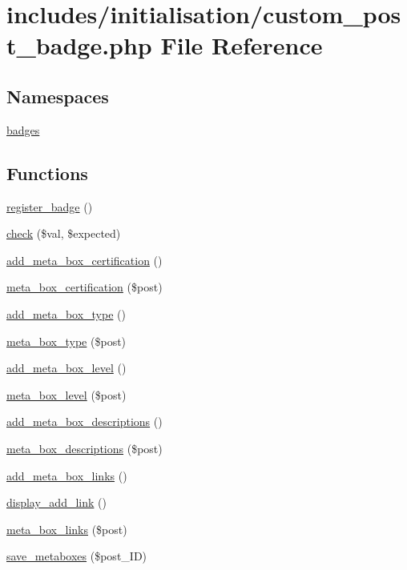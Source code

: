 \hypertarget{custom__post__badge_8php}{}\section{includes/initialisation/custom\+\_\+post\+\_\+badge.php File Reference}
\label{custom__post__badge_8php}
\subsection*{Namespaces}
\begin{DoxyCompactItemize}
\item 
 \hyperlink{namespacebadges}{badges}
\end{DoxyCompactItemize}
\subsection*{Functions}
\begin{DoxyCompactItemize}
\item 
\hyperlink{custom__post__badge_8php_a33deba5b6a1388aa48d025aa34ec563b}{register\+\_\+badge} ()
\item 
\hyperlink{custom__post__badge_8php_a4920b56515f99313245ba19ff157a6cb}{check} (\$val, \$expected)
\item 
\hyperlink{custom__post__badge_8php_a6e6e0c44942c25f85776256861a3fd1b}{add\+\_\+meta\+\_\+box\+\_\+certification} ()
\item 
\hyperlink{custom__post__badge_8php_a37a17ab374405a4d4b22ca9b7e15ca7d}{meta\+\_\+box\+\_\+certification} (\$post)
\item 
\hyperlink{custom__post__badge_8php_aece38a3aed297c3dd41ba1004b81d285}{add\+\_\+meta\+\_\+box\+\_\+type} ()
\item 
\hyperlink{custom__post__badge_8php_a9c0574de1d784cf81ca5f0d41a0d2b0e}{meta\+\_\+box\+\_\+type} (\$post)
\item 
\hyperlink{custom__post__badge_8php_a55aa37a8c0fec63ab57bdc92f27e4067}{add\+\_\+meta\+\_\+box\+\_\+level} ()
\item 
\hyperlink{custom__post__badge_8php_a057ee86955ef0d79d5392199d59e9669}{meta\+\_\+box\+\_\+level} (\$post)
\item 
\hyperlink{custom__post__badge_8php_a75c89049cd1078ac576d58767c940e08}{add\+\_\+meta\+\_\+box\+\_\+descriptions} ()
\item 
\hyperlink{custom__post__badge_8php_a12dcf908d94ad00f47c5299a713a654e}{meta\+\_\+box\+\_\+descriptions} (\$post)
\item 
\hyperlink{custom__post__badge_8php_a87f911057c5751a522ab5348959de73b}{add\+\_\+meta\+\_\+box\+\_\+links} ()
\item 
\hyperlink{custom__post__badge_8php_a6b7b150039e422ea2db107924ba0d94b}{display\+\_\+add\+\_\+link} ()
\item 
\hyperlink{custom__post__badge_8php_a4b30fec2d73d4b177cc18fabd83d3791}{meta\+\_\+box\+\_\+links} (\$post)
\item 
\hyperlink{custom__post__badge_8php_a28bdcc9bcf574671a008a4e559b1eb11}{save\+\_\+metaboxes} (\$post\+\_\+\+ID)
\end{DoxyCompactItemize}


